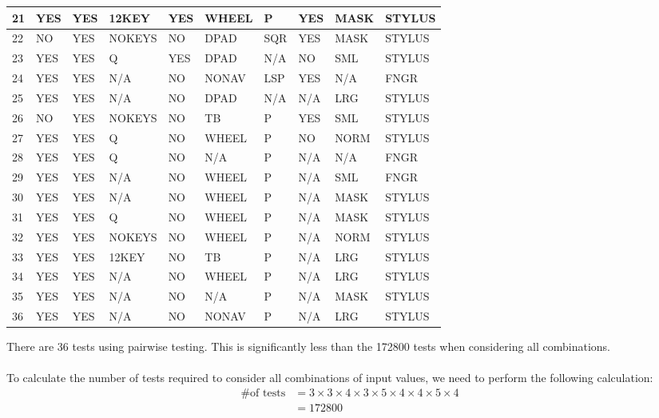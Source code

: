 \documentclass[12pt, letterpaper, titlepage]{article}
\begin{document}
\begin{tabularx}{\textwidth}{|X|X|X|X|X|X|X|X|X|X|}
    21 & YES & YES & 12KEY & YES & WHEEL & P & YES & MASK & STYLUS \\ \hline
    22 & NO & YES & NOKEYS & NO & DPAD & SQR & YES & MASK & STYLUS \\ \hline
    23 & YES & YES & Q & YES & DPAD & N/A & NO & SML & STYLUS \\ \hline
    24 & YES & YES & N/A & NO & NONAV & LSP & YES & N/A & FNGR \\ \hline
    25 & YES & YES & N/A & NO & DPAD & N/A & N/A & LRG & STYLUS \\ \hline
    26 & NO & YES & NOKEYS & NO & TB & P & YES & SML & STYLUS \\ \hline
    27 & YES & YES & Q & NO & WHEEL & P & NO & NORM & STYLUS \\ \hline
    28 & YES & YES & Q & NO & N/A & P & N/A & N/A & FNGR \\ \hline
    29 & YES & YES & N/A & NO & WHEEL & P & N/A & SML & FNGR \\ \hline
    30 & YES & YES & N/A & NO & WHEEL & P & N/A & MASK & STYLUS \\ \hline
    31 & YES & YES & Q & NO & WHEEL & P & N/A & MASK & STYLUS \\ \hline
    32 & YES & YES & NOKEYS & NO & WHEEL & P & N/A & NORM & STYLUS \\ \hline
    33 & YES & YES & 12KEY & NO & TB & P & N/A & LRG & STYLUS \\ \hline
    34 & YES & YES & N/A & NO & WHEEL & P & N/A & LRG & STYLUS \\ \hline
    35 & YES & YES & N/A & NO & N/A & P & N/A & MASK & STYLUS \\ \hline
    36 & YES & YES & N/A & NO & NONAV & P & N/A & LRG & STYLUS \\ \hline
\end{tabularx}
\normalsize
There are 36 tests using pairwise testing. This is significantly less than the 172800 tests when considering all combinations. \\\\
To calculate the number of tests required to consider all combinations of input values, we need to perform the following calculation:
\begin{align}
    \text{\# of tests} &= 3 \times 3 \times 4 \times 3 \times 5 \times 4 \times 4 \times 5 \times 4\\
    &= 172800 \\
\end{align}
\end{document}
